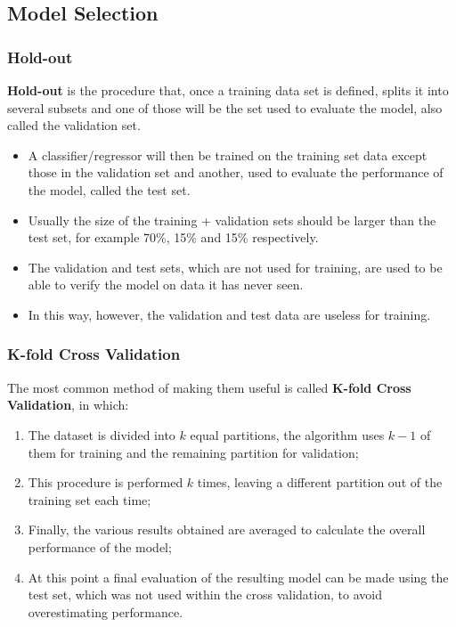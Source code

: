 \subsection{Model Selection}

\subsubsection{Hold-out}
\textbf{Hold-out} is the procedure that, once a training data set is defined, splits it into several subsets and one of those will be the set used to evaluate the model, also called the validation set.
\begin{itemize}
    \item A classifier/regressor will then be trained on the training set data except those in the validation set and another, used to evaluate the performance of the model, called the test set.
    \item Usually the size of the training + validation sets should be larger than the test set, for example 70\%, 15\% and 15\% respectively.
    \item The validation and test sets, which are not used for training, are used to be able to verify the model on data it has never seen.
    \item In this way, however, the validation and test data are useless for training.
\end{itemize}

\subsubsection{K-fold Cross Validation}
The most common method of making them useful is called \textbf{K-fold Cross Validation}, in which:
\begin{enumerate}
    \item The dataset is divided into $k$ equal partitions, the algorithm uses $k-1$ of them for training and the remaining partition for validation;
    \item This procedure is performed $k$ times, leaving a different partition out of the training set each time;
    \item Finally, the various results obtained are averaged to calculate the overall performance of the model;
    \item At this point a final evaluation of the resulting model can be made using the test set, which was not used within the cross validation, to avoid overestimating performance.
\end{enumerate}       


